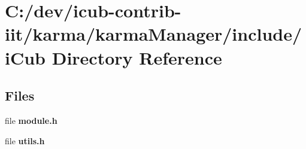 \section{C\+:/dev/icub-\/contrib-\/iit/karma/karma\+Manager/include/i\+Cub Directory Reference}
\label{dir_bb4e408f99a50b7aa026cb103234dde2}
\subsection*{Files}
\begin{DoxyCompactItemize}
\item 
file {\bfseries module.\+h}
\item 
file {\bfseries utils.\+h}
\end{DoxyCompactItemize}
